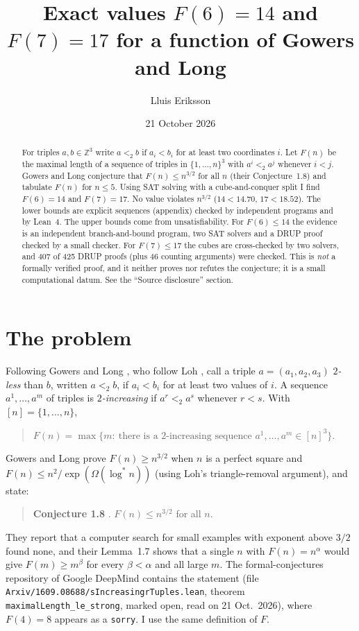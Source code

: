 \documentclass[11pt]{article}
\title{Exact values $F(6)=14$ and $F(7)=17$ for a function of Gowers and Long}
\author{Lluis Eriksson}
\date{21 October 2026}
\begin{document}
\sloppy
\maketitle

\begin{abstract}
For triples $a,b\in\mathbb Z^3$ write $a<_2 b$ if $a_i<b_i$ for at least two coordinates $i$. Let $F(n)$ be the maximal length of a sequence of triples in $\{1,\dots,n\}^3$ with $a^i<_2 a^j$ whenever $i<j$. Gowers and Long \cite{gl} conjecture that $F(n)\le n^{3/2}$ for all $n$ (their Conjecture~1.8) and tabulate $F(n)$ for $n\le5$. Using SAT solving with a cube-and-conquer split I find $F(6)=14$ and $F(7)=17$. No value violates $n^{3/2}$ ($14<14.70$, $17<18.52$). The lower bounds are explicit sequences (appendix) checked by independent programs and by Lean~4. The upper bounds come from unsatisfiability. For $F(6)\le14$ the evidence is an independent branch-and-bound program, two SAT solvers and a DRUP proof checked by a small checker. For $F(7)\le17$ the cubes are cross-checked by two solvers, and 407 of 425 DRUP proofs (plus 46 counting arguments) were checked. This is \emph{not} a formally verified proof, and it neither proves nor refutes the conjecture; it is a small computational datum. See the ``Source disclosure'' section.
\end{abstract}

\section{The problem}
Following Gowers and Long \cite{gl}, who follow Loh \cite{loh}, call a triple $a=(a_1,a_2,a_3)$ \emph{$2$-less} than $b$, written $a<_2 b$, if $a_i<b_i$ for at least two values of $i$. A sequence $a^1,\dots,a^m$ of triples is \emph{$2$-increasing} if $a^r<_2 a^s$ whenever $r<s$. With $[n]=\{1,\dots,n\}$,
\begin{quote}
$F(n)=\max\{m:\ \text{there is a 2-increasing sequence }a^1,\dots,a^m\in[n]^3\}.$
\end{quote}
Gowers and Long prove $F(n)\ge n^{3/2}$ when $n$ is a perfect square and $F(n)\le n^2/\exp(\Omega(\log^* n))$ (using Loh's triangle-removal argument), and state:
\begin{quote}
\textbf{Conjecture 1.8} \cite{gl}. $F(n)\le n^{3/2}$ for all $n$.
\end{quote}
They report that a computer search for small examples with exponent above $3/2$ found none, and their Lemma~1.7 shows that a single $n$ with $F(n)=n^{\alpha}$ would give $F(m)\ge m^{\beta}$ for every $\beta<\alpha$ and all large $m$. The formal-conjectures repository of Google DeepMind \cite{fc} contains the statement (file \texttt{Arxiv/1609.08688/sIncreasingrTuples.lean}, theorem \texttt{maximalLength\_le\_strong}, marked open, read on 21 Oct.\ 2026), where $F(4)=8$ appears as a \texttt{sorry}. I use the same definition of $F$.
\end{document}
